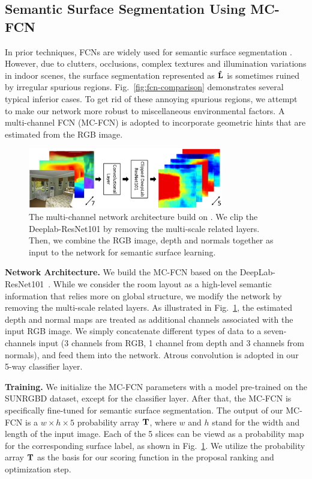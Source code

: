 \subsection{Semantic Surface Segmentation Using MC-FCN}
\label{sec:surfacelabel}
In prior techniques, FCNs are widely used for semantic surface segmentation \cite{dasgupta2016delay,ren2016coarse,mallya2015learning}. 
%
However, due to clutters, occlusions, complex textures and illumination variations in indoor scenes, the surface segmentation represented as $\mathbf{\hat{L}}$ is sometimes ruined by irregular spurious regions. 
Fig.~\ref{fig:fcn-comparison} demonstrates several typical inferior cases.
%
To get rid of these annoying spurious regions, we attempt to make our network more robust to miscellaneous environmental factors. 
A multi-channel FCN (MC-FCN) is adopted to incorporate geometric hints that are estimated from the RGB image. 
%


\begin{figure}
	\centering
	\includegraphics[width=8.5cm]{figure/MC-FCN.png}
	\caption{The multi-channel network architecture build on \cite{chen2016deeplab}. We clip the Deeplab-ResNet101 by removing the multi-scale related layers. Then, we combine the RGB image, depth and normals together as input to the network for semantic surface learning. }
	\label{fig:fcn-multi-channel}
\end{figure}

\vspace{0.1cm}
\noindent\textbf{Network Architecture.}
We build the MC-FCN based on the DeepLab-ResNet101~\cite{chen2016deeplab}. 
%
While we consider the room layout as a high-level semantic information that relies more on global structure, we modify the network by removing the multi-scale related layers. 
As illustrated in Fig.~\ref{fig:fcn-multi-channel}, the estimated depth and normal maps are treated as additional channels associated with the input RGB image. 
We simply concatenate different types of data to a seven-channels input (3 channels from RGB, 1 channel from depth and 3 channels from normals), and feed them into the network. 
Atrous convolution is adopted in our 5-way classifier layer. 

\vspace{0.1cm}
\noindent\textbf{Training.} We initialize the MC-FCN parameters with a model pre-trained on the SUNRGBD dataset, except for the classifier layer. 
After that, the MC-FCN is specifically fine-tuned for semantic surface segmentation.
%
The output of our MC-FCN is a $w\times h \times 5$ probability array $\mathbf{T}$, where $w$ and $h$ stand for the width and length of the input image. Each of the 5 slices can be viewd as a probability map for the corresponding surface label, as shown in Fig.~\ref{fig:fcn-multi-channel}. We utilize the probability array $\mathbf{T}$ as the basis for our scoring function in the proposal ranking and optimization step. 
 


